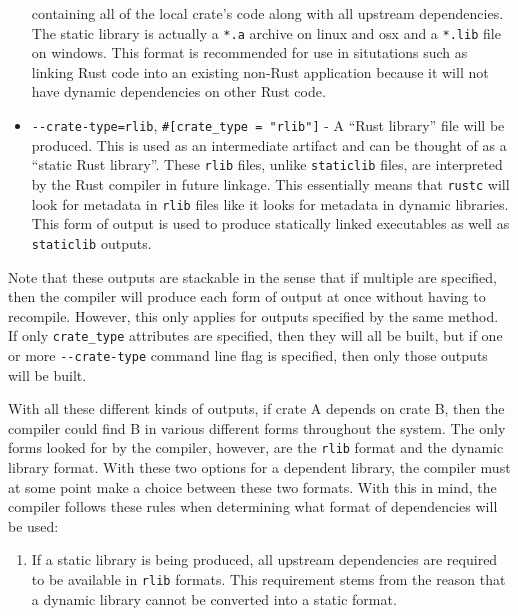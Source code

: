 \documentclass[]{article}
\begin{document}
\begin{itemize}
  containing all of the local crate's code along with all upstream
  dependencies. The static library is actually a \texttt{*.a} archive on
  linux and osx and a \texttt{*.lib} file on windows. This format is
  recommended for use in situtations such as linking Rust code into an
  existing non-Rust application because it will not have dynamic
  dependencies on other Rust code.
\item
  \texttt{-\/-crate-type=rlib}, \texttt{\#{[}crate\_type = "rlib"{]}} -
  A ``Rust library'' file will be produced. This is used as an
  intermediate artifact and can be thought of as a ``static Rust
  library''. These \texttt{rlib} files, unlike \texttt{staticlib} files,
  are interpreted by the Rust compiler in future linkage. This
  essentially means that \texttt{rustc} will look for metadata in
  \texttt{rlib} files like it looks for metadata in dynamic libraries.
  This form of output is used to produce statically linked executables
  as well as \texttt{staticlib} outputs.
\end{itemize}

Note that these outputs are stackable in the sense that if multiple are
specified, then the compiler will produce each form of output at once
without having to recompile. However, this only applies for outputs
specified by the same method. If only \texttt{crate\_type} attributes
are specified, then they will all be built, but if one or more
\texttt{-\/-crate-type} command line flag is specified, then only those
outputs will be built.

With all these different kinds of outputs, if crate A depends on crate
B, then the compiler could find B in various different forms throughout
the system. The only forms looked for by the compiler, however, are the
\texttt{rlib} format and the dynamic library format. With these two
options for a dependent library, the compiler must at some point make a
choice between these two formats. With this in mind, the compiler
follows these rules when determining what format of dependencies will be
used:

\begin{enumerate}
\def\labelenumi{\arabic{enumi}.}
\itemsep1pt\parskip0pt
\item
  If a static library is being produced, all upstream dependencies are
  required to be available in \texttt{rlib} formats. This requirement
  stems from the reason that a dynamic library cannot be converted into
  a static format.
\end{enumerate}
\end{document}
